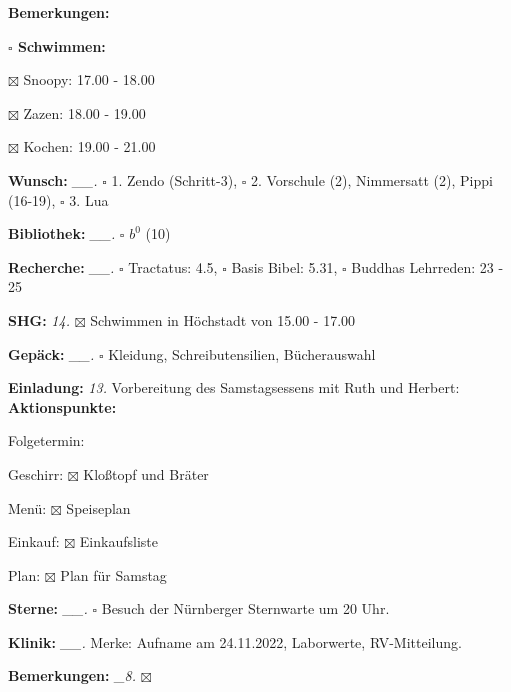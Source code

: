 \documentclass[10pt,a4paper]{article}
\newcounter{notec}
\newcommand\prop[1] {{\color {alizarin} {\bf #1}}}             %
\newcommand\opti[1] {{\color {amethyst} {\bf #1}}}             %
\newcommand\mand[1] {{\color {burntorange} {\bf #1}}}          %
\newcommand\bottomspace{\vskip 4pt}
\newcommand\n[1] { {\sl #1.} \hskip 5pt }
\begin{document}
\begin{mdframed}[style=daystyle]
\begin{labeling}{{\mand {Bemerkungen:}}}
\begin{minipage}{0.75\textwidth}
\begin{labeling}{\prop {$\square$ {Schwimmen:}}}
      \item[$\boxtimes$ Snoopy:]     17.00 - 18.00
      \item[$\boxtimes$ Zazen:]      18.00 - 19.00
      \item[$\boxtimes$ Kochen:]     19.00 - 21.00
      \end{labeling}
    \end{minipage}
    \bottomspace
  \item[{\mand {Wunsch:}}]       \n{\_\_} $\square$ 1. Zendo (Schritt-3),
      $\square$ 2. Vorschule (2), Nimmersatt (2), Pippi (16-19), $\square$ 3. Lua
  \item[{\mand {Bibliothek:}}]   \n{\_\_} $\square$ $b^{0}$ (10)
  \item[{\mand {Recherche:}}]    \n{\_\_} $\square$ Tractatus: 4.5, $\square$ Basis Bibel: 5.31,
      $\square$ Buddhas Lehrreden: 23 - 25
  \item[{\mand {SHG:}}]            \n{14} $\boxtimes$ Schwimmen in Höchstadt von 15.00 - 17.00
  \item[{\mand {Gepäck:}}]       \n{\_\_} $\square$ Kleidung, Schreibutensilien, Bücherauswahl    
  \item[{\opti {Einladung:}}]      \n{13} Vorbereitung des Samstagsessens mit Ruth und Herbert:
    \vskip -2pt
    {\bf Aktionspunkte:}    
    \vskip -2pt
    \begin{minipage}{0.75\textwidth}  
      \begin{labeling}{Folgetermin:} 
        \setlength\itemsep{-3pt}  
      \item[Geschirr:] $\boxtimes$ Kloßtopf und Bräter
      \item[Menü:]     $\boxtimes$ Speiseplan
      \item[Einkauf:]  $\boxtimes$ Einkaufsliste
      \item[Plan:]     $\boxtimes$ Plan für Samstag
      \end{labeling}
    \end{minipage}

  \item[{\opti {Sterne:}}]       \n{\_\_} $\square$ Besuch der Nürnberger Sternwarte um 20 Uhr.
  \item[{\opti {Klinik:}}]       \n{\_\_} Merke: Aufname am 24.11.2022, Laborwerte, RV-Mitteilung.
  \item[{\mand {Bemerkungen:}}]   \n{\_8} $\boxtimes$
  \end{labeling}
    
  \setcounter{notec}{0}
  

\end{mdframed}
\end{document}
